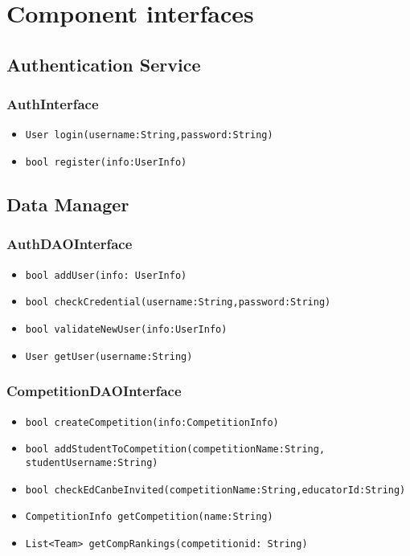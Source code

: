 \section{Component interfaces}
\label{s:component-interfaces}%


\subsection{Authentication Service}
\subsubsection{AuthInterface}
\begin{itemize}
    \item \texttt{User login(username:String,password:String)}
    \item \texttt{bool register(info:UserInfo)}
\end{itemize}

\subsection{Data Manager}
\subsubsection{AuthDAOInterface}
\begin{itemize}
    \item \texttt{bool addUser(info: UserInfo)}
    \item \texttt{bool checkCredential(username:String,password:String)}
    \item \texttt{bool validateNewUser(info:UserInfo)}
    \item \texttt{User getUser(username:String)}
\end{itemize}

\subsubsection{CompetitionDAOInterface}
\begin{itemize}
    \item \texttt{bool createCompetition(info:CompetitionInfo)}
    \item \texttt{bool addStudentToCompetition(competitionName:String, studentUsername:String)}
    \item \texttt{bool checkEdCanbeInvited(competitionName:String,educatorId:String)}
    \item \texttt{CompetitionInfo getCompetition(name:String)}
    \item \texttt{List<Team> getCompRankings(competitionid: String)}
\end{itemize}


